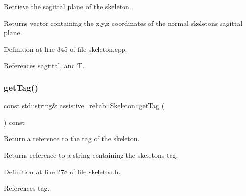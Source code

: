 Retrieve the sagittal plane of the skeleton. 

\begin{DoxyReturn}{Returns}
vector containing the x,y,z coordinates of the normal skeleton\textquotesingle{}s sagittal plane. 
\end{DoxyReturn}


Definition at line 345 of file skeleton.\+cpp.


\begin{DoxyCode}{0}

\end{DoxyCode}


References sagittal, and T.

\mbox{\label{classassistive__rehab_1_1Skeleton_a185654045d5e43b3853cdb8fdd676da6}} 
\subsubsection{\texorpdfstring{getTag()}{getTag()}}
{\footnotesize\ttfamily const std\+::string\& assistive\+\_\+rehab\+::\+Skeleton\+::get\+Tag (\begin{DoxyParamCaption}{ }\end{DoxyParamCaption}) const\hspace{0.3cm}{\ttfamily [inline]}}



Return a reference to the tag of the skeleton. 

\begin{DoxyReturn}{Returns}
reference to a string containing the skeleton\textquotesingle{}s tag. 
\end{DoxyReturn}


Definition at line 278 of file skeleton.\+h.


\begin{DoxyCode}{0}

\end{DoxyCode}


References tag.

\mbox{\label{classassistive__rehab_1_1Skeleton_a2bdcc0d686a5a232aa2c07528cf2e647}} 
